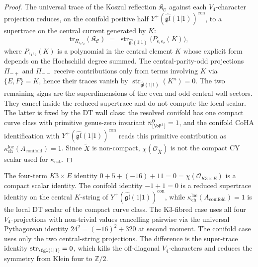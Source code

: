 \begin{proof}
The universal trace of the Koszul reflection
$\mathfrak{K}_{\mathcal{C}}$ against each $V_4$-character projection
reduces, on the conifold positive half
$Y^+(\widehat{\mathfrak{gl}}(1|1))^{\mathrm{con}}$, to a supertrace on
the central current generated by $K$:
\[
 \mathrm{tr}_{\Pi_{\epsilon_1 \epsilon_2}}(\mathfrak{K}_{\mathcal{C}})
 \;=\; \operatorname{str}_{\widehat{\mathfrak{gl}}(1|1)}\bigl(P_{\epsilon_1
 \epsilon_2}(K)\bigr),
\]
where $P_{\epsilon_1 \epsilon_2}(K)$ is a polynomial in the central
element $K$ whose explicit form depends on the Hochschild degree
summed. The central-parity-odd projections $\Pi_{-+}$ and $\Pi_{--}$
receive contributions only from terms involving $K$ via $\{E, F\} = K$,
hence their traces vanish by
$\operatorname{str}_{\widehat{\mathfrak{gl}}(1|1)}(K^n)=0$.  The two
remaining signs are the superdimensions of the even and odd central
wall sectors.  They cancel inside the reduced supertrace and do not
compute the local scalar.  The latter is fixed by the DT wall class:
the resolved conifold has one compact curve class with primitive
genus-zero invariant $n^0_{[\bP^1]}=1$, and the conifold CoHA
identification with $Y^+(\widehat{\mathfrak{gl}}(1|1))^{\mathrm{con}}$
reads this primitive contribution as
$\kappa_{\mathrm{ch}}^{\mathrm{loc}}(A_{\mathrm{conifold}})=1$.
Since $\widetilde X$ is non-compact, $\chi(\mathcal O_{\widetilde X})$
is not the compact CY scalar used for $\kappa_{\mathrm{cat}}$.
\end{proof}

\begin{remark}
\label{rem:k3-vs-conifold-two-term}
The four-term $K3 \times E$ identity
$0 + 5 + (-16) + 11 = 0 = \chi(\mathcal{O}_{K3 \times E})$ is a
compact scalar identity.  The conifold identity $-1+1=0$ is a reduced
supertrace identity on the central $K$-string of
$Y^+(\widehat{\mathfrak{gl}}(1|1))^{\mathrm{con}}$, while
$\kappa_{\mathrm{ch}}^{\mathrm{loc}}(A_{\mathrm{conifold}})=1$ is the
local DT scalar of the compact curve class.  The K3-fibred case uses
all four $V_4$-projections with non-trivial values cancelling pairwise
via the universal Pythagorean identity $24^2 = (-16)^2 + 320$ at
second moment.  The conifold case uses only the two central-string
projections.  The
difference is the super-trace identity $\operatorname{str}_{\fgl(1
\vert 1)} = 0$, which kills the off-diagonal $V_4$-characters and
reduces the symmetry from Klein four to $\mathbb{Z}/2$.
\end{remark}


